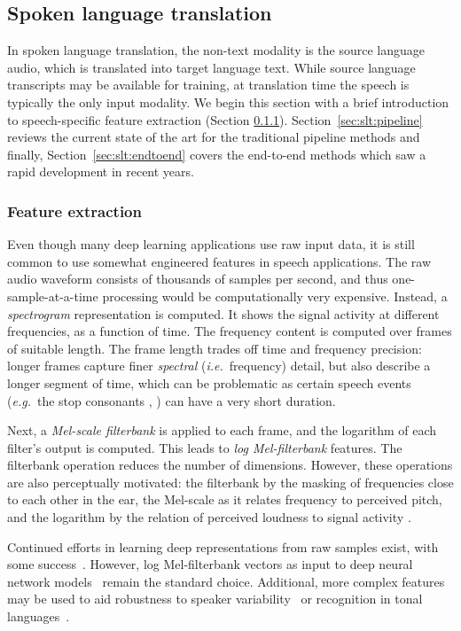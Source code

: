 \documentclass{svjour3}
\newcommand{\ie}[1]{\textit{i.e.}~#1}
\newcommand{\eg}[1]{\textit{e.g.}~#1}
\begin{document}
     
\subsection{Spoken language translation}
    \label{sec:slt}
    In spoken language translation, the non-text modality is the source language audio, which is translated into target language text. While source language transcripts may be available for training, at translation time the speech is typically the only input modality.
We begin this section with a brief introduction to speech-specific feature extraction (Section \ref{sec:slt:featureextraction}). Section~\ref{sec:slt:pipeline} reviews the current state of the art for the traditional pipeline methods and finally, Section~\ref{sec:slt:endtoend} covers the end-to-end methods which saw a rapid development in recent years.

\subsubsection{Feature extraction}
\label{sec:slt:featureextraction}
Even though many deep learning applications use raw input data, it is still common to use somewhat engineered features in speech applications.
The raw audio waveform consists of thousands of samples per second, and thus one-sample-at-a-time processing would be computationally very expensive. Instead, a \emph{spectrogram} representation is computed. It shows the signal activity at different frequencies, as a function of time. The frequency content is computed over frames of suitable length. The frame length trades off time and frequency precision: longer frames capture finer \emph{spectral} (\ie frequency) detail, but also describe a longer segment of time, which can be problematic as certain speech events (\eg the stop consonants , ) can have a very short duration.

Next, a \emph{Mel-scale filterbank} 
is applied to each frame, and the logarithm of each filter's output 
is computed. This leads to \emph{log Mel-filterbank} features. The filterbank operation reduces the number of dimensions. However, these operations are also perceptually motivated: the filterbank by the masking of frequencies close to each other in the ear, the Mel-scale as it relates frequency to perceived pitch, and the logarithm by the relation of perceived loudness to signal activity \citep{pulkki2015communication}.

Continued efforts in learning deep representations from raw samples exist, with some success~\citep{sainath2015learning}. However, log Mel-filterbank vectors as input to deep neural network models~\citep{mohamed2012understanding} 
remain the standard choice.
Additional, more complex features may be used to aid robustness to speaker variability~\citep{saon2013speaker} or recognition in tonal languages~\citep{ghahremani2014pitch}.
\end{document}
